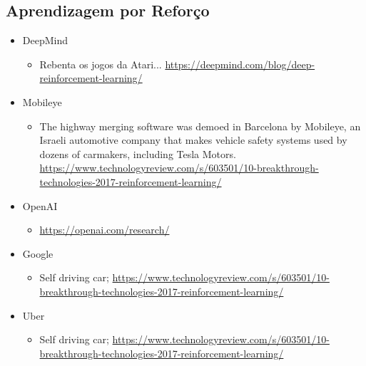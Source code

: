 \subsection{Aprendizagem por Reforço}
\begin{itemize}
\item DeepMind
    \begin{itemize}
    
    \item Rebenta os jogos da Atari...
    \url{https://deepmind.com/blog/deep-reinforcement-learning/}
    
    \end{itemize}

\item Mobileye
    \begin{itemize}
    
    \item The highway merging software was demoed in Barcelona by Mobileye, an Israeli automotive company that makes vehicle safety systems used by dozens of carmakers, including Tesla Motors.
    \url{https://www.technologyreview.com/s/603501/10-breakthrough-technologies-2017-reinforcement-learning/}
    
    \end{itemize}

\item OpenAI
    \begin{itemize}
    \item \url{https://openai.com/research/}
    \end{itemize}

\item Google
    \begin{itemize}
    \item Self driving car;
    \url{https://www.technologyreview.com/s/603501/10-breakthrough-technologies-2017-reinforcement-learning/}
    \end{itemize}

\item Uber
    \begin{itemize}
    \item Self driving car;
    \url{https://www.technologyreview.com/s/603501/10-breakthrough-technologies-2017-reinforcement-learning/}
    \end{itemize}

\end{itemize}










